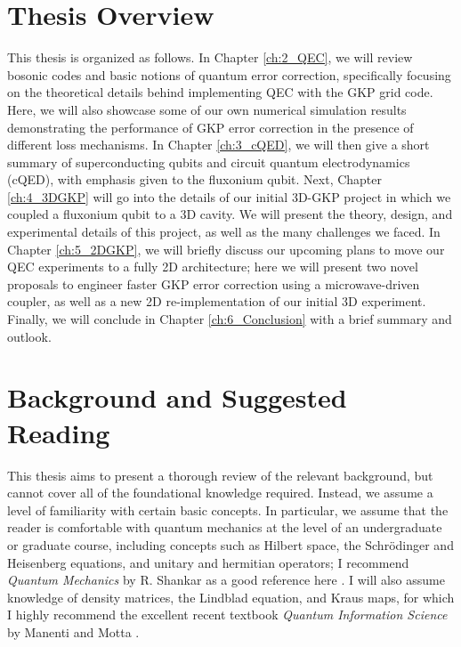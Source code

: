 \section{Thesis Overview}
This thesis is organized as follows. In Chapter \ref{ch:2_QEC}, we will review bosonic codes and basic notions of quantum error correction, specifically focusing on the theoretical details behind implementing QEC with the GKP grid code. Here, we will also showcase some of our own numerical simulation results demonstrating the performance of GKP error correction in the presence of different loss mechanisms. In Chapter \ref{ch:3_cQED}, we will then give a short summary of superconducting qubits and circuit quantum electrodynamics (cQED), with emphasis given to the fluxonium qubit. Next, Chapter \ref{ch:4_3DGKP} will go into the details of our initial 3D-GKP project in which we coupled a fluxonium qubit to a 3D cavity. We will present the theory, design, and experimental details of this project, as well as the many challenges we faced. In Chapter \ref{ch:5_2DGKP}, we will briefly discuss our upcoming plans to move our QEC experiments to a fully 2D architecture; here we will present two novel proposals to engineer faster GKP error correction using a microwave-driven coupler, as well as a new 2D re-implementation of our initial 3D experiment. Finally, we will conclude in Chapter \ref{ch:6_Conclusion} with a brief summary and outlook.


\section{Background and Suggested Reading}

This thesis aims to present a thorough review of the relevant background, but cannot cover all of the foundational knowledge required. Instead, we assume a level of familiarity with certain basic concepts. In particular, we assume that the reader is comfortable with quantum mechanics at the level of an undergraduate or graduate course, including concepts such as Hilbert space, the Schr\"odinger and Heisenberg equations, and unitary and hermitian operators; I recommend \textit{Quantum Mechanics} by R. Shankar as a good reference here \cite{shankar1994principles}. I will also assume knowledge of density matrices, the Lindblad equation, and Kraus maps, for which I highly recommend the excellent recent textbook \textit{Quantum Information Science} by Manenti and Motta \cite{manenti2023quantum}. 

